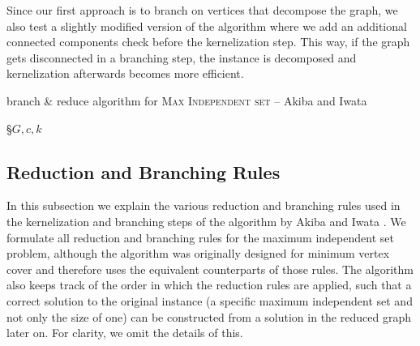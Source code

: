 \documentclass[]{article}
\begin{document}
Since our first approach is to branch on vertices that decompose the graph, we also test a slightly modified version of the algorithm where we add an additional connected components check before the kernelization step. This way, if the graph gets disconnected in a branching step, the instance is decomposed and kernelization afterwards becomes more efficient.

\begin{algorithm}
	\caption{branch \& reduce algorithm for \textsc{Max Independent set} -- Akiba and Iwata \cite{AkibaIwata}}\label{alg:bb}
	\DontPrintSemicolon
	
	\S{$G,c,k$}
	
	
\end{algorithm}
\newpage
\subsection{Reduction and Branching Rules} \label{red}

In this subsection we explain the various reduction and branching rules used in the kernelization and branching steps of the algorithm by Akiba and Iwata \cite{AkibaIwata}. We formulate all reduction and branching rules for the maximum independent set problem, although the algorithm was originally designed for minimum vertex cover and therefore uses the equivalent counterparts of those rules. The algorithm also keeps track of the order in which the reduction rules are applied, such that a correct solution to the original instance (a specific maximum independent set and not only the size of one) can be constructed from a solution in the reduced graph later on. For clarity, we omit the details of this.
\end{document}
